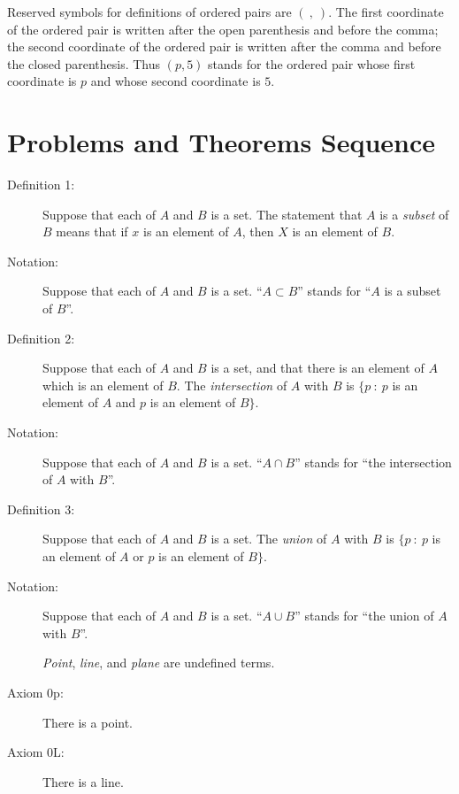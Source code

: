 \documentclass{article}
\begin{document}
Reserved symbols for definitions of ordered pairs are $( \ , \ )$. The first coordinate of the ordered pair is written after the open parenthesis and before the comma; the second coordinate of the ordered pair is written after the comma and before the closed parenthesis. Thus $(p,5)$ stands for the ordered pair whose first coordinate is $p$ and whose second coordinate is $5$.


\section{Problems and Theorems Sequence}

\begin{description}

  \item[Definition 1:] Suppose that each of $A$ and $B$ is a set. The statement that $A$ is a \emph{subset} of $B$ means that if $x$ is an element of $A$, then $X$ is an element of $B$.

  \item[Notation:] Suppose that each of $A$ and $B$ is a set. ``$A \subset B$'' stands for ``$A$ is a subset of $B$''.

  \item[Definition 2:] Suppose that each of $A$ and $B$ is a set, and that there is an element of $A$ which is an element of $B$. The \emph{intersection} of $A$ with $B$ is $\{ p\ :\ p$ is an element of $A$ and $p$ is an element of $B \}$.

  \item[Notation:] Suppose that each of $A$ and $B$ is a set. ``$A \cap B$'' stands for ``the intersection of $A$ with $B$''.

  \item[Definition 3:] Suppose that each of $A$ and $B$ is a set. The \emph{union} of $A$ with $B$ is $\{ p\ :\ p $ is an element of $A$ or $p$ is an element of $B \}$.

  \item[Notation:] Suppose that each of $A$ and $B$ is a set. ``$A \cup B$'' stands for ``the union of $A$ with $B$''.

  \item[] \emph{Point}, \emph{line}, and \emph{plane} are undefined terms.

  \item[Axiom 0p:] There is a point.

  \item[Axiom 0L:] There is a line.


\end{description}
\end{document}
